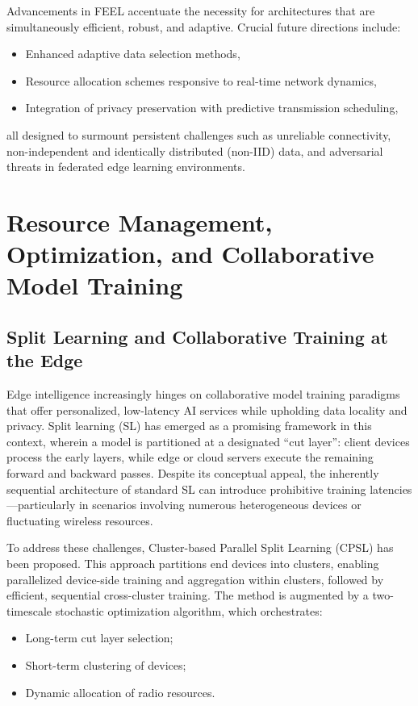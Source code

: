 \documentclass[sigconf]{acmart}
\begin{document}
Advancements in FEEL accentuate the necessity for architectures that are simultaneously efficient, robust, and adaptive. Crucial future directions include:
\begin{itemize}
    \item Enhanced adaptive data selection methods,
    \item Resource allocation schemes responsive to real-time network dynamics,
    \item Integration of privacy preservation with predictive transmission scheduling,
\end{itemize}
all designed to surmount persistent challenges such as unreliable connectivity, non-independent and identically distributed (non-IID) data, and adversarial threats in federated edge learning environments.

\section{Resource Management, Optimization, and Collaborative Model Training}
\label{sec:resource_management}

\subsection{Split Learning and Collaborative Training at the Edge}

Edge intelligence increasingly hinges on collaborative model training paradigms that offer personalized, low-latency AI services while upholding data locality and privacy. Split learning (SL) has emerged as a promising framework in this context, wherein a model is partitioned at a designated ``cut layer'': client devices process the early layers, while edge or cloud servers execute the remaining forward and backward passes. Despite its conceptual appeal, the inherently sequential architecture of standard SL can introduce prohibitive training latencies—particularly in scenarios involving numerous heterogeneous devices or fluctuating wireless resources.

To address these challenges, Cluster-based Parallel Split Learning (CPSL) has been proposed. This approach partitions end devices into clusters, enabling parallelized device-side training and aggregation within clusters, followed by efficient, sequential cross-cluster training. The method is augmented by a two-timescale stochastic optimization algorithm, which orchestrates:

\begin{itemize}
    \item Long-term cut layer selection;
    \item Short-term clustering of devices;
    \item Dynamic allocation of radio resources.
\end{itemize}
\end{document}
